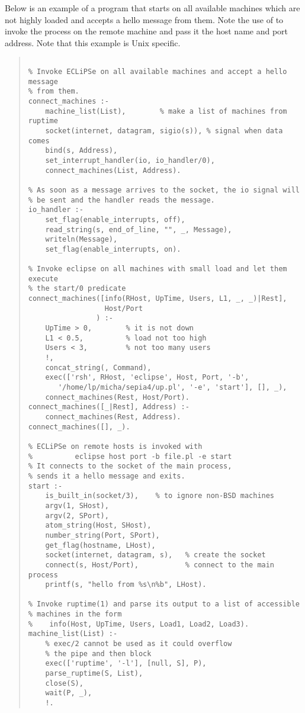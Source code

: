 Below is an example of a program that starts {\eclipse} on all
available machines which are not highly loaded and accepts
a hello message from them.
Note the use of  to invoke the process on the remote machine
and pass it the host name and port address. Note that this example is Unix
specific.
\begin{quote}
\begin{verbatim}

% Invoke ECLiPSe on all available machines and accept a hello message
% from them.
connect_machines :-
    machine_list(List),        % make a list of machines from ruptime
    socket(internet, datagram, sigio(s)), % signal when data comes
    bind(s, Address),
    set_interrupt_handler(io, io_handler/0),
    connect_machines(List, Address).

% As soon as a message arrives to the socket, the io signal will
% be sent and the handler reads the message.
io_handler :-
    set_flag(enable_interrupts, off),
    read_string(s, end_of_line, "", _, Message),
    writeln(Message),
    set_flag(enable_interrupts, on).

% Invoke eclipse on all machines with small load and let them execute
% the start/0 predicate
connect_machines([info(RHost, UpTime, Users, L1, _, _)|Rest],
                  Host/Port
                ) :-
    UpTime > 0,        % it is not down
    L1 < 0.5,          % load not too high
    Users < 3,         % not too many users
    !,
    concat_string(, Command),
    exec(['rsh', RHost, 'eclipse', Host, Port, '-b',
       '/home/lp/micha/sepia4/up.pl', '-e', 'start'], [], _),
    connect_machines(Rest, Host/Port).
connect_machines([_|Rest], Address) :-
    connect_machines(Rest, Address).
connect_machines([], _).

% ECLiPSe on remote hosts is invoked with
%          eclipse host port -b file.pl -e start
% It connects to the socket of the main process,
% sends it a hello message and exits.
start :-
    is_built_in(socket/3),    % to ignore non-BSD machines
    argv(1, SHost),
    argv(2, SPort),
    atom_string(Host, SHost),
    number_string(Port, SPort),
    get_flag(hostname, LHost),
    socket(internet, datagram, s),   % create the socket
    connect(s, Host/Port),           % connect to the main process
    printf(s, "hello from %s\n%b", LHost).

% Invoke ruptime(1) and parse its output to a list of accessible
% machines in the form
%    info(Host, UpTime, Users, Load1, Load2, Load3).
machine_list(List) :-
    % exec/2 cannot be used as it could overflow
    % the pipe and then block
    exec(['ruptime', '-l'], [null, S], P),
    parse_ruptime(S, List),
    close(S),
    wait(P, _),
    !.
\end{verbatim}
\end{quote}

